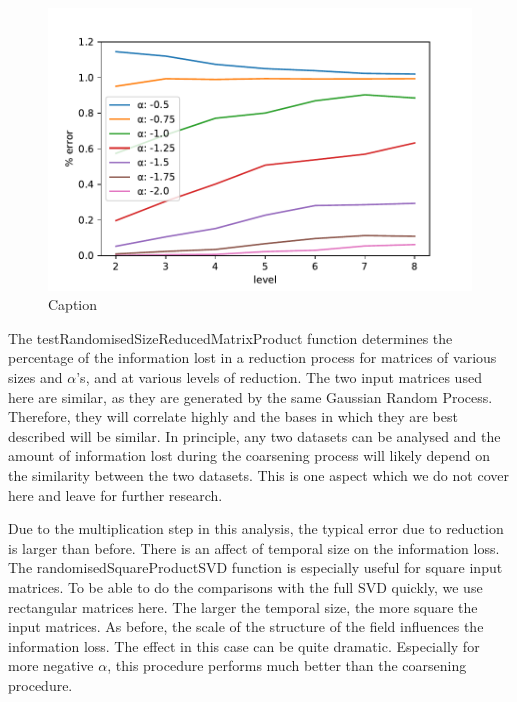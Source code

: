 \documentclass{acm_proc_article-sp}
\begin{document}
\begin{figure}[h]
\begin{center}
\includegraphics[scale=0.5]{Results/plotRandomisedSizeReducedMatrixProduct.pdf}
\caption[Small caption]{Caption}
\label{fig:plotRandomisedSizeReducedMatrixProduct}
\end{center}
\end{figure}

The testRandomisedSizeReducedMatrixProduct function determines the percentage of the information lost in a reduction process for matrices of various sizes and $\alpha$'s, and at various levels of reduction. The two input matrices used here are similar, as they are generated by the same Gaussian Random Process. Therefore, they will correlate highly and the bases in which they are best described will be similar. In principle, any two datasets can be analysed and the amount of information lost during the coarsening process will likely depend on the similarity between the two datasets. This is one aspect which we do not cover here and leave for further research.

Due to the multiplication step in this analysis, the typical error due to reduction is larger than before. There is an affect of temporal size on the information loss. The randomisedSquareProductSVD function is especially useful for square input matrices. To be able to do the comparisons with the full SVD quickly, we use rectangular matrices here. The larger the temporal size, the more square the input matrices. As before, the scale of the structure of the field influences the information loss. The effect in this case can be quite dramatic. Especially for more negative $\alpha$, this procedure performs much better than the coarsening procedure.
\end{document}
